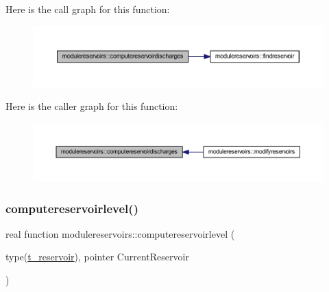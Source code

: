Here is the call graph for this function\+:\nopagebreak
\begin{figure}[H]
\begin{center}
\leavevmode
\includegraphics[width=350pt]{namespacemodulereservoirs_a8a99c19b113e1731bd473173c164300a_cgraph}
\end{center}
\end{figure}
Here is the caller graph for this function\+:\nopagebreak
\begin{figure}[H]
\begin{center}
\leavevmode
\includegraphics[width=350pt]{namespacemodulereservoirs_a8a99c19b113e1731bd473173c164300a_icgraph}
\end{center}
\end{figure}
\mbox{\label{namespacemodulereservoirs_a473bf29bfb29eda6a398dead645aec5a}} 
\subsubsection{\texorpdfstring{computereservoirlevel()}{computereservoirlevel()}}
{\footnotesize\ttfamily real function modulereservoirs\+::computereservoirlevel (\begin{DoxyParamCaption}\item[{type(\mbox{\hyperlink{structmodulereservoirs_1_1t__reservoir}{t\+\_\+reservoir}}), pointer}]{Current\+Reservoir }\end{DoxyParamCaption})\hspace{0.3cm}{\ttfamily [private]}}

